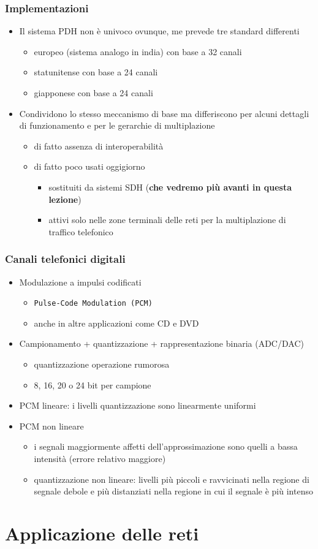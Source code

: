 \documentclass{book}
\begin{document}
\subsection{Implementazioni}
\begin{itemize}
\item Il sistema PDH non è univoco ovunque, me prevede tre standard differenti
  \begin{itemize}
  \item europeo (sistema analogo in india) con base a 32 canali
  \item statunitense con base a 24 canali
  \item giapponese con base a 24 canali
  \end{itemize}
\item Condividono lo stesso meccanismo di base ma differiscono per alcuni dettagli di funzionamento e per le gerarchie di multiplazione
  \begin{itemize}
  \item di fatto assenza di interoperabilità
  \item di fatto poco usati oggigiorno
    \begin{itemize}
    \item sostituiti da sistemi SDH ({\bf che vedremo più avanti in questa lezione})
    \item attivi solo nelle zone terminali delle reti per la multiplazione di traffico telefonico
    \end{itemize}
  \end{itemize}
\end{itemize}
\subsection{Canali telefonici digitali}
\begin{itemize}
\item Modulazione a impulsi codificati
  \begin{itemize}
  \item {\tt Pulse-Code Modulation (PCM)}
  \item anche in altre applicazioni come CD e DVD
  \end{itemize}
\item Campionamento + quantizzazione + rappresentazione binaria (ADC/DAC)
  \begin{itemize}
  \item quantizzazione operazione rumorosa
  \item 8, 16, 20 o 24 bit per campione
  \end{itemize}
\item PCM lineare: i livelli quantizzazione sono linearmente uniformi
\item PCM non lineare
  \begin{itemize}
  \item i segnali maggiormente affetti dell'approssimazione sono quelli a bassa intensità (errore relativo maggiore)
    \item quantizzazione non lineare: livelli più piccoli e ravvicinati nella regione di segnale debole e più distanziati nella regione in cui il segnale è più intenso
  \end{itemize}
\end{itemize}


\chapter{Applicazione delle reti}
\printindex
\end{document}
